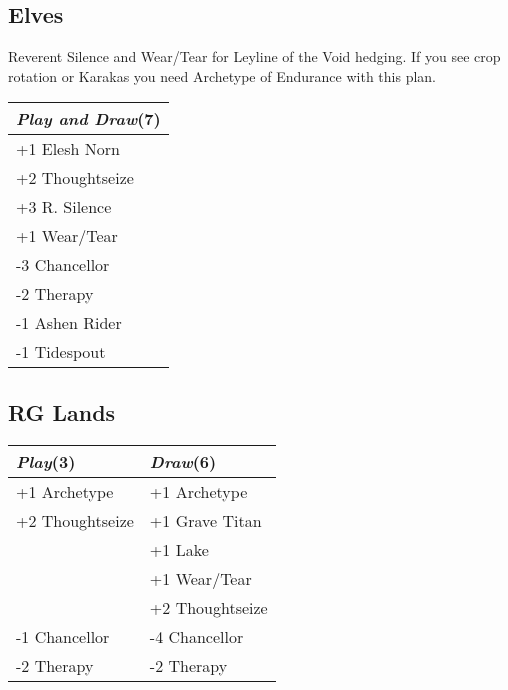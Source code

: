 \documentclass{article}
\renewcommand *\contentsname{Contents}
\begin{document}
\begin{multicols}{2}
\subsection*{Elves}
Reverent Silence and Wear/Tear for Leyline of the Void hedging. If you see crop rotation or Karakas you need Archetype of Endurance with this plan.\begin{center}
\begin{tabular}{| l |}
\hline
\textit{Play and Draw}(7) \\
\hline
\cellcolor[HTML]{BBDDBB}\small{+1 Elesh Norn}\\
\cellcolor[HTML]{BBDDBB}\small{+2 Thoughtseize}\\
\cellcolor[HTML]{BBDDBB}\small{+3 R. Silence}\\
\cellcolor[HTML]{BBDDBB}\small{+1 Wear/Tear}\\
\cellcolor[HTML]{DDBBBB}\small{-3 Chancellor}\\
\cellcolor[HTML]{DDBBBB}\small{-2 Therapy}\\
\cellcolor[HTML]{DDBBBB}\small{-1 Ashen Rider}\\
\cellcolor[HTML]{DDBBBB}\small{-1 Tidespout}\\
\hline
\end{tabular}
\end{center}
\subsection*{RG Lands}
\begin{center}
\begin{tabular}{| l | l |}
\hline
\textit{Play}(3) & \textit{Draw}(6) \\
\hline
\cellcolor[HTML]{BBDDBB}\small{+1 Archetype} & \cellcolor[HTML]{BBDDBB}\small{+1 Archetype}\\
\cellcolor[HTML]{BBDDBB}\small{+2 Thoughtseize} & \cellcolor[HTML]{BBDDBB}\small{+1 Grave Titan}\\
 & \cellcolor[HTML]{BBDDBB}\small{+1 Lake}\\
 & \cellcolor[HTML]{BBDDBB}\small{+1 Wear/Tear}\\
 & \cellcolor[HTML]{BBDDBB}\small{+2 Thoughtseize}\\
\cellcolor[HTML]{DDBBBB}\small{-1 Chancellor} & \cellcolor[HTML]{DDBBBB}\small{-4 Chancellor}\\
\cellcolor[HTML]{DDBBBB}\small{-2 Therapy} & \cellcolor[HTML]{DDBBBB}\small{-2 Therapy}\\
\hline
\end{tabular}
\end{center}

\end{multicols}
\end{document}
